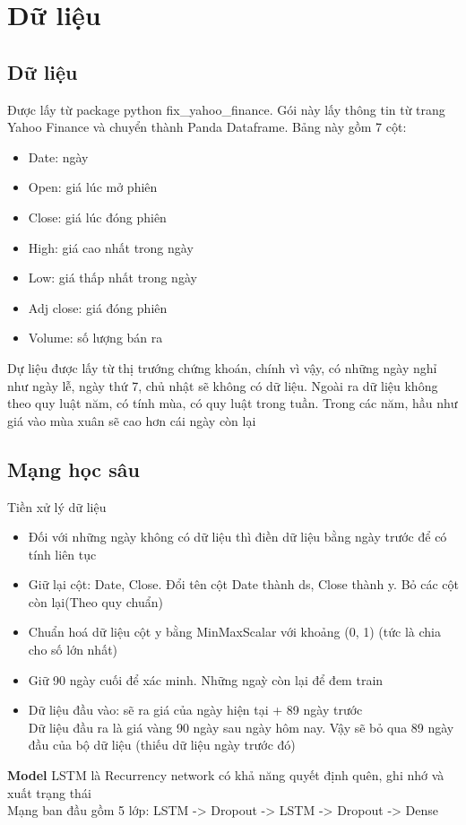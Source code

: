 %
\chapter{Dữ liệu}
\label{sec:data}

\section{Dữ liệu}
Được lấy từ package python fix\_yahoo\_finance. Gói này lấy thông tin từ trang Yahoo Finance và chuyển thành Panda Dataframe.
Bảng này gồm 7 cột:
\begin{itemize}
    \item Date: ngày
    \item Open: giá lúc mở phiên
    \item Close: giá lúc đóng phiên
    \item High: giá cao nhất trong ngày
    \item Low: giá thấp nhất trong ngày
    \item Adj close: giá đóng phiên
    \item Volume: số lượng bán ra
\end{itemize}

Dự liệu được lấy từ thị trướng chứng khoán, chính vì vậy, có những ngày nghỉ như ngày lễ, ngày thứ 7, chủ nhật sẽ không có dữ liệu.
Ngoài ra dữ liệu không theo quy luật năm, có tính mùa, có quy luật trong tuần. Trong các năm, hầu như giá vào mùa xuân sẽ cao hơn cái ngày còn lại


\section{Mạng học sâu}
Tiền xử lý dữ liệu
\begin{itemize}
    \item Đối với những ngày không có dữ liệu thì điền dữ liệu bằng ngày trước để có tính liên tục \\
    \item Giữ lại cột: Date, Close. Đổi tên cột Date thành ds, Close thành y. Bỏ các cột còn lại(Theo quy chuẩn) \\
    \item Chuẩn hoá dữ liệu cột y bằng MinMaxScalar với khoảng (0, 1) (tức là chia cho số lớn nhất) \\
    \item Giữ 90 ngày cuối để xác minh. Những ngaỳ còn lại để đem train \\
    \item Dữ liệu đầu vào: sẽ ra giá của ngày hiện tại + 89 ngày trước \\
    Dữ liệu đầu ra là giá vàng 90 ngày sau ngày hôm nay. Vậy sẽ bỏ qua 89 ngày đầu của bộ dữ liệu (thiếu dữ liệu ngày trước đó) \\
\end{itemize}
\textbf{Model}
    LSTM là Recurrency network có khả năng quyết định quên, ghi nhớ và xuất trạng thái \\
    Mạng ban đầu gồm 5 lớp: LSTM -> Dropout -> LSTM -> Dropout -> Dense \\



